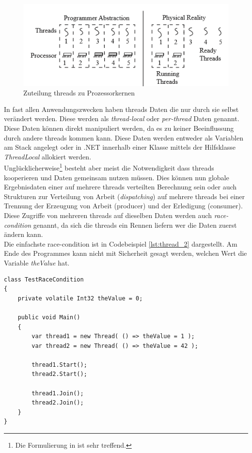 \begin{figure}
	\centering
	\includegraphics[width=0.7\linewidth]{images/threads_cores.png}
	\caption{Zuteilung threads zu Prozessorkernen\cite[S. 140]{Dahlin2012}}
	\label{fig:threads_cores}
\end{figure}

In fast allen Anwendungszwecken haben threads Daten die nur durch sie selbst verändert werden. Diese werden als \emph{thread-local} oder \emph{per-thread} Daten genannt. Diese Daten können direkt manipuliert werden, da es zu keiner Beeinflussung durch andere threads kommen kann. Diese Daten werden entweder als Variablen am Stack angelegt oder in .NET innerhalb einer Klasse mittels der Hilfsklasse \textit{ThreadLocal} allokiert werden\cite{ms_threadlocal}. 
\\Unglücklicherweise\footnote{Die Formulierung in \cite[S. 179]{Dahlin2012} ist sehr treffend.} besteht aber meist die Notwendigkeit dass threads kooperieren und Daten gemeinsam nutzen müssen. Dies können nun globale Ergebnisdaten einer auf mehrere threads verteilten Berechnung sein oder auch Strukturen zur Verteilung von Arbeit (\textit{dispatching}) auf mehrere threads bei einer Trennung der Erzeugung von Arbeit (producer) und der Erledigung (consumer). Diese Zugriffe von mehreren threads auf dieselben Daten werden auch \emph{race-condition} genannt, da sich die threads ein Rennen liefern wer die Daten zuerst ändern kann.
\\Die einfachste race-condition ist in Codebeispiel \ref{lst:thread_2} dargestellt\cite[S. 182]{Dahlin2012}. Am Ende des Programmes kann nicht mit Sicherheit gesagt werden, welchen Wert die Variable \textit{theValue} hat.

\begin{lstlisting}[caption={Thread race-condition},label={lst:thread_2},captionpos=b]
class TestRaceCondition
{
	private volatile Int32 theValue = 0;
	
	public void Main()
	{
        var thread1 = new Thread( () => theValue = 1 );
		var thread2 = new Thread( () => theValue = 42 );

		thread1.Start();
		thread2.Start();

		thread1.Join();
		thread2.Join();
	}
}
\end{lstlisting}

